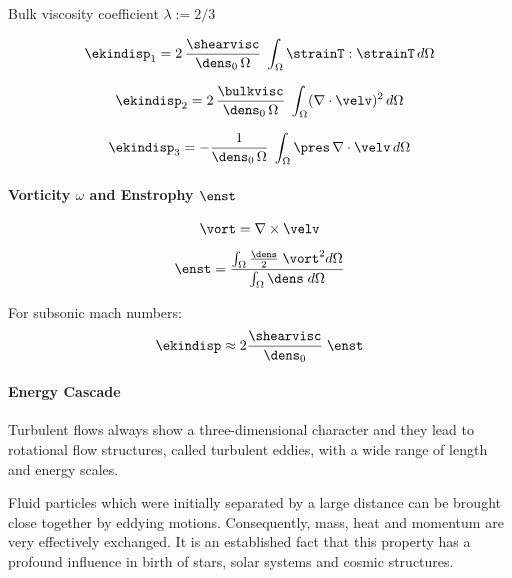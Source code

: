 Bulk viscosity coefficient $\lambda := 2/3$

\begin{equation}
\label{eq:ekindisp1}
    \ekindisp_1 = 2\,\frac{\shearvisc}{\dens_0\,\Omega} \; \int_\Omega \strainT : \strainT \, d\Omega
\end{equation}

\begin{equation}
\label{eq:ekindisp2}
    \ekindisp_2 = 2\,\frac{\bulkvisc}{\dens_0\,\Omega} \; \int_\Omega (\nabla \cdot \velv)^2 \, d\Omega
\end{equation}

\begin{equation}
\label{eq:ekindisp3}
    \ekindisp_3 = -\frac{1}{\dens_0\,\Omega} \; \int_\Omega \pres \, \nabla \cdot \velv \, d\Omega
\end{equation}

\paragraph{Vorticity $\omega$ and Enstrophy $\enst$}

\begin{equation}
\label{eq:vort}
    \vort = \nabla \times \velv
\end{equation}

\begin{equation}
\label{eq:enst}
    \enst = \frac{\int_\Omega \frac{\dens}{2} \; \vort^2 d\Omega}{\int_\Omega \dens \; d\Omega}
\end{equation}

For subsonic mach numbers:
\begin{equation}
\label{eq:ekindisp2}
    \ekindisp \approx 2 \frac{\shearvisc}{\dens_0} \; \enst
\end{equation}

\paragraph{Energy Cascade}

Turbulent flows always show a three-dimensional character and they lead to
rotational flow structures, called turbulent eddies, with a wide range of
length and energy scales.

Fluid particles which were initially separated by a large distance can be
brought close together by eddying motions. Consequently, mass, heat and momentum
are very effectively exchanged. It is an established fact that this
property has a profound influence in birth of stars, solar systems and cosmic
structures.

